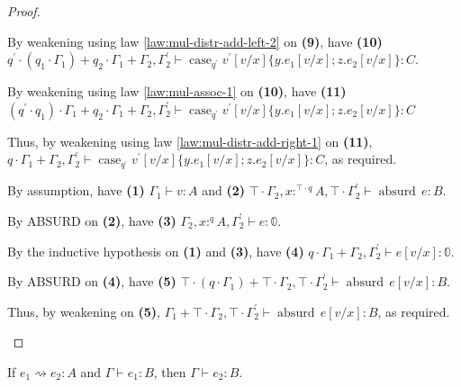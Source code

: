 \documentclass[acmsmall,screen,nonacm]{acmart}
\DeclareMathOperator{\case}{\text{case}}
\newcommand{\zero}{\mathbb{0}}
\DeclareMathOperator{\absurd}{\text{absurd}}
\newcommand{\tee}{\vdash}
\DeclareMathOperator{\red}{\rightsquigarrow}
\begin{document}
\begin{proof}
\begin{description}
    By weakening using law \ref{law:mul-distr-add-left-2} on \textbf{(9)}, have \textbf{(10)} $q^\prime \cdot (q_1 \cdot \Gamma_1) + q_2 \cdot \Gamma_1 + \Gamma_2, \Gamma_2^\prime \tee \case_{q^\prime} v^\prime[v/x] \{y.e_1[v/x]; z.e_2[v/x]\} : C$.
    
    By weakening using law \ref{law:mul-assoc-1} on \textbf{(10)}, have \textbf{(11)}  $(q^\prime \cdot q_1) \cdot \Gamma_1 + q_2 \cdot \Gamma_1 + \Gamma_2, \Gamma_2^\prime \tee \case_{q^\prime} v^\prime[v/x] \{y.e_1[v/x]; z.e_2[v/x]\} : C$

    Thus, by weakening using law \ref{law:mul-distr-add-right-1} on \textbf{(11)}, $q \cdot \Gamma_1 + \Gamma_2, \Gamma_2^\prime \tee \case_{q^\prime} v^\prime[v/x] \{y.e_1[v/x]; z.e_2[v/x]\} : C$, as required.
    \\
    \item[Case ABSURD.]
    By assumption, have \textbf{(1)} $\Gamma_1 \tee v : A$ and \textbf{(2)} $\top \cdot \Gamma_2, x :^{\top \cdot q} A, \top \cdot \Gamma_2^\prime \tee \absurd \, e : B$.

    By ABSURD on \textbf{(2)}, have \textbf{(3)} $\Gamma_2, x :^q A, \Gamma_2^\prime \tee e : \zero$.

    By the inductive hypothesis on \textbf{(1)} and \textbf{(3)}, have \textbf{(4)} $q \cdot \Gamma_1 + \Gamma_2, \Gamma_2^\prime \tee e[v/x] : \zero$.

    By ABSURD on \textbf{(4)}, have \textbf{(5)} $\top \cdot (q \cdot \Gamma_1) + \top \cdot \Gamma_2, \top \cdot \Gamma_2^\prime \tee \absurd \, e[v/x] : B$.

    Thus, by weakening on \textbf{(5)}, $\Gamma_1 + \top \cdot \Gamma_2, \top \cdot \Gamma_2^\prime \tee \absurd \, e[v/x] : B$, as required.
  \end{description}
\end{proof}

\begin{lemma}
\label{lem:graded-modal-type-preservation-beta-reduction-laws}
  If\/ $e_1 \red e_2 : A$ and $\Gamma \tee e_1 : B$, then $\Gamma \tee e_2 : B$.
\end{lemma}
\end{document}

